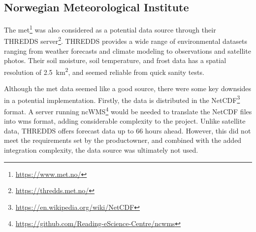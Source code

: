\subsection{Norwegian Meteorological Institute}

The \acrfull{met}\footnote{\url{https://www.met.no/}} was also considered as a potential data source through their THREDDS server\footnote{\url{https://thredds.met.no/}}. THREDDS provides a wide range of environmental datasets ranging from weather forecasts and climate modeling to observations and satellite photos. Their soil moisture, soil temperature, and frost data has a spatial resolution of \qty{2.5}{\kilo\meter\squared}, and seemed reliable from quick sanity tests.

Although the \acrshort{met} data seemed like a good source, there were some key downsides in a potential implementation. Firstly, the data is distributed in the NetCDF\footnote{\url{https://en.wikipedia.org/wiki/NetCDF}} format. A server running ncWMS\footnote{\url{https://github.com/Reading-eScience-Centre/ncwms}} would be needed to translate the NetCDF files into \gls{wms} format, adding considerable complexity to the project. Unlike satellite data, THREDDS offers forecast data up to \qty{66}{} hours ahead. However, this did not meet the requirements set by the \gls{productowner}, and combined with the added integration complexity, the data source was ultimately not used.